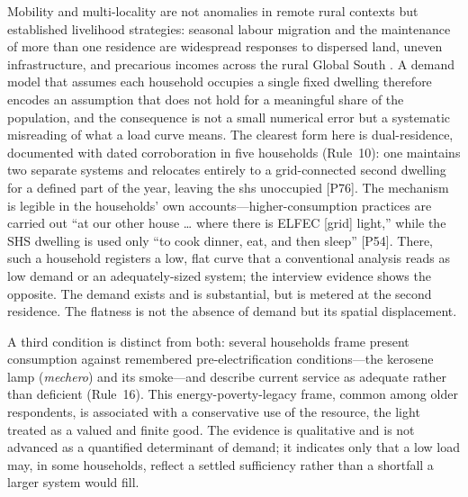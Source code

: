 \documentclass[final,3p,times,onecolumn]{elsarticle}
\begin{document}
Mobility and multi-locality are not anomalies in remote rural contexts but established livelihood strategies: seasonal labour migration and the maintenance of more than one residence are widespread responses to dispersed land, uneven infrastructure, and precarious incomes across the rural Global South
\citep{rural-multilocal-livelihoods, energy-stacking}. A demand model that assumes each household occupies a single fixed dwelling therefore encodes an assumption that does not hold for a meaningful share of the population, and the consequence is not a small numerical error but a systematic misreading of what a load curve means. The clearest form here is dual-residence, documented with dated corroboration in five households (Rule~10): one maintains two separate systems and relocates entirely to a grid-connected second dwelling for a defined part of the year, leaving the \gls{shs} unoccupied [P76]. The mechanism is legible in the households' own accounts---higher-consumption practices are carried out ``at our other house \ldots{} where there is ELFEC [grid] light,'' while the SHS dwelling is used only ``to cook dinner, eat, and then sleep'' [P54]. There, such a household registers a low, flat curve that a conventional analysis reads as low demand or an adequately-sized system; the interview evidence shows the opposite. The demand exists and is substantial, but is metered at the second residence. The flatness is not the absence of demand but its spatial displacement.

A third condition is distinct from both: several households frame present consumption against remembered pre-electrification conditions---the kerosene lamp (\emph{mechero}) and its smoke---and describe current service as adequate rather than deficient (Rule~16). This energy-poverty-legacy frame, common among older respondents, is associated with a conservative use of the resource, the light treated as a valued and finite good. The evidence is qualitative and is not advanced as a quantified determinant of demand; it indicates only that a low load may, in some households, reflect a settled sufficiency rather than a shortfall a larger system would fill.
\end{document}
